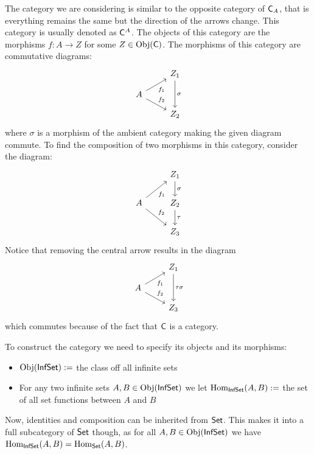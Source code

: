 \begin{problem}
\end{problem}

\begin{solution}
	The category we are considering is similar to the opposite category of $\mathsf{C}_A$, that is everything remains the same but the direction of the arrows change. This category is usually denoted as $\mathsf{C}^A$. The objects of this category are the morphisms $f : A \to Z$ for some $Z \in \mathrm{Obj}(\mathsf{C})$. The morphisms of this category are commutative diagrams:
	\begin{equation*}
		\begin{tikzcd}[row sep=small]
			& Z_1 \arrow[dd, "\sigma"]\\
			A \arrow[ur, "f_1" swap]
			  \arrow[dr, "f_2"] & {} \\
			& Z_2
		\end{tikzcd}
	\end{equation*}
	where $\sigma$ is a morphism of the ambient category making the given diagram commute. To find the composition of two morphisms in this category, consider the diagram:
	\begin{equation*}
		\begin{tikzcd}
			& Z_1 \arrow[d, "\sigma"]\\
			A \arrow[ur, "f_1" swap]
			  \arrow[dr, "f_2"] & Z_2 \arrow[d, "\tau"] \\
			& Z_3
		\end{tikzcd}
	\end{equation*}
	Notice that removing the central arrow results in the diagram
	\begin{equation*}
		\begin{tikzcd}[row sep=small]
			& Z_1 \arrow[dd, "\tau\sigma"]\\
			A \arrow[ur, "f_1" swap]
			  \arrow[dr, "f_2"] & {} \\
			& Z_3
		\end{tikzcd}
	\end{equation*}
	which commutes because of the fact that $\mathsf{C}$ is a category.
\end{solution}

\begin{problem}
\end{problem}

\begin{solution}
	To construct the category we need to specify its objects and its morphisms:
	\begin{itemize}
		\item $\mathrm{Obj}(\mathsf{InfSet}) := $ the class off all infinite sets
		\item For any two infinite sets $A, B \in \mathrm{Obj}(\mathsf{InfSet})$ we let $\mathrm{Hom}_{\mathsf{InfSet}}(A,B) := $ the set of all set functions between $A$ and $B$
	\end{itemize}
	Now, identities and composition can be inherited from $\mathsf{Set}$. This makes it into a full subcategory of $\mathsf{Set}$ though, as for all $A, B \in \mathrm{Obj}(\mathsf{InfSet})$ we have $\mathrm{Hom}_{\mathsf{InfSet}}(A,B) = \mathrm{Hom}_{\mathsf{Set}}(A,B)$.
\end{solution}

